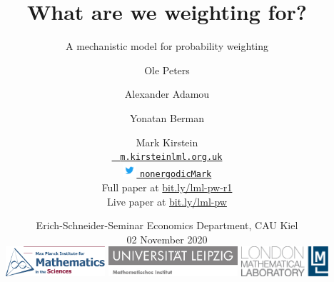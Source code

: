 \title[\insertlogo\\
\vspace{.5em}
\lmlblue{Mark Kirstein}]{\textbf{
What are we weighting for?
}}
\subtitle{A mechanistic model for probability weighting}


\author[M Kirstein]{
Ole Peters \and Alexander Adamou \and Yonatan Berman \and Mark Kirstein\\
\vspace{.5em}
{\small
\href{mailto:m.kirstein@lml.org.uk}{\Letter ~ \texttt{m.kirstein{\MVAt}lml.org.uk}} \\
\href{https://twitter.com/nonergodicMark}{\includegraphics[height=1.4em,valign=c]{img/Twitter_Logo_Blue} \MVAt \texttt{nonergodicMark}}} \\
\vspace{1em}
Full paper at \url{bit.ly/lml-pw-r1}\\
Live paper at \url{bit.ly/lml-pw}
}

\date[02 Nov 2020]{
Erich-Schneider-Seminar Economics Department, CAU Kiel\\
02 November 2020\\
\vspace{1em}
\href{https://www.mis.mpg.de/jjost/research/economics.html}{\includegraphics[height=1.1cm]{img/MPIMIS_en.png}}
\hfill
\href{https://www.math.uni-leipzig.de/cms/de/forschung/abteilungen/wima/}{\includegraphics[height=1.1cm]{img/Uni_Leipzig_MathemInstitut.jpg}}
\hfill
\href{http://lml.org.uk}{
\includegraphics[height=1.1cm]{img/LML_LOGO_whiteBG.jpg}}
}
